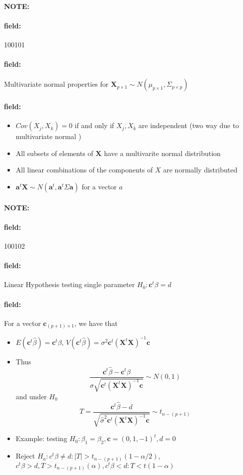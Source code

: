 \documentclass[12pt]{article}
\newenvironment{note}{\paragraph{NOTE:}}{}
\newenvironment{field}{\paragraph{field:}}{}
\begin{document}
\begin{note} \begin{field} \tiny 100101 \end{field}
  \begin{field}
    Multivariate normal properties for $\mathbf{X}_{p \times 1} \sim N(\mu_{p\times 1}, \Sigma_{p \times p})$
  \end{field}
  \begin{field}
    \begin{itemize}
      \item $Cov(X_j,X_k) = 0$ if and only if $X_j,X_k$ are independent (two way due to multivariate normal )
      \item All subsets of elements of $\mathbf{X}$ have a multivarite normal distribution
      \item All linear combinations of the components of $X$ are normally distributed
      \item $\mathbf{a}^t \mathbf{X} \sim N(\mathbf{a}^t, \mathbf{a}^t \Sigma \mathbf{a})$ for a vector $a$
    \end{itemize}
  \end{field}
\end{note}


\begin{note} \begin{field} \tiny 100102 \end{field}
  \begin{field}
    Linear Hypothesis testing single parameter $H_0: \mathbf{c}^t \beta = d$
  \end{field}
  \begin{field}
    For a vector $\mathbf{c}_{(p+1)\times 1}$, we have that
    \begin{itemize}
      \item $E(\textbf{c}^t\hat{\beta}) = \mathbf{c}^t \beta$, $V(\mathbf{c}^t \hat{\beta}) = \sigma^2 \mathbf{c}^t (\mathbf{X}^t \mathbf{X})^{-1} \mathbf{c}$
      \item Thus $$ \frac{\mathbf{c}^t \hat{\beta} - \mathbf{c}^t \beta }{\sigma \sqrt{\mathbf{c}^t(\mathbf{X}^t \mathbf{X})^{-1} \mathbf{c}}} \sim N(0,1)$$ and under $H_0$
      $$ T = \frac{\mathbf{c}^t \hat{\beta} - d}{ \sqrt{\hat{\sigma}^2\mathbf{c}^t(\mathbf{X}^t \mathbf{X})^{-1} \mathbf{c}}} \sim t_{n - (p+1)}$$
      \item Example: testing $H_0: \beta_1 = \beta_2, \mathbf{c} = (0,1,-1)^t, d = 0$
      \item Reject $H_a: c^t \beta \neq d:  |T| > t_{n - (p+1)}(1-\alpha/2)$, $c^t \beta > d, T > t_{n-(p+1)}(\alpha), c^t\beta < d: T < t(1 - \alpha)$
    \end{itemize}
  \end{field}
\end{note}
\end{document}
